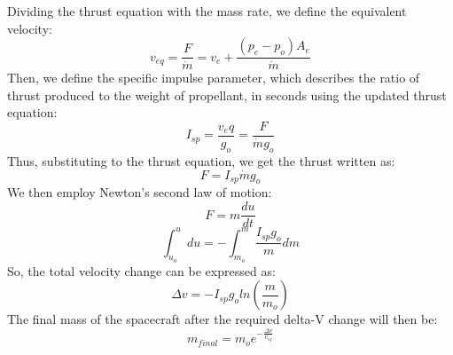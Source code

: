 Dividing the thrust equation with the mass rate, we define the equivalent velocity:
\begin{equation}
v_{eq}=\frac{F}{\dot{m}}=v_e+\frac{(p_e-p_o) A_e}{\dot{m}}
\end{equation}
Then, we define the specific impulse parameter, which describes the ratio of thrust produced to the weight of propellant, in seconds using the updated thrust equation:
\begin{equation}
I_{sp}=\frac{v_eq}{g_o} =\frac{F}{\dot{m}g_o}
\end{equation}
Thus, substituting to the thrust equation, we get the thrust written as:
\begin{equation}
F=I_{sp}\dot{m}g_o
\end{equation}
We then employ Newton’s second law of motion:
\begin{equation}
F=m\frac{du}{dt}
\end{equation}
\begin{equation}
\int_{u_o}^{u}du=-\int_{m_o}^{m}\frac{I_{sp}g_o}{m}dm
\end{equation}
So, the total velocity change can be expressed as:
\begin{equation}
\Delta v=-I_{sp}g_o ln(\frac{m}{m_o})
\end{equation}
The final mass of the spacecraft after the required delta-V change will then be:
\begin{equation}
m_{final}=m_{o}e^{-\frac{\Delta v}{v_{eq}}}
\end{equation}
